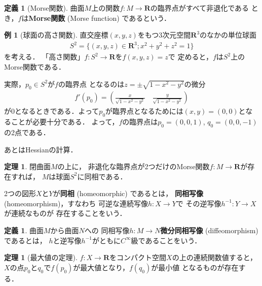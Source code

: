\documentclass[11pt, a4paper, dvipdfmx]{jsarticle}
\theoremstyle{definition}
\newcommand{\rr}{\mathbf{R}}
\newcommand{\dip}{\displaystyle} %
\theoremstyle{mystyle}
\newtheorem{DFN}[Axiom]{定義}
\newtheorem{THM}[Axiom]{定理}
\newtheorem{EG}[Axiom]{例}
\numberwithin{equation}{section} %
\begin{document}
\begin{DFN}[Morse関数]
    曲面$M$上の関数$f\colon M\to \rr$の臨界点がすべて非退化である
    とき，$f$は\textbf{Morse関数} (Morse function) であるという．
\end{DFN}

\begin{EG}[球面の高さ関数]
    直交座標$(x,y,z)$をもつ3次元空間$\rr^3$のなかの単位球面
    \begin{align}
        S^2=\{(x,y,z)\in\rr^3; x^2+y^2+z^2=1\}
    \end{align}
    を考える．
    「高さ関数」$f\colon S^2\to\rr$を$f(x,y,z)=z$で
    定めると，$f$は$S^2$上のMorse関数である．

    実際，$p_0\in S^2$が$f$の臨界点
    となるのは$z=\pm \sqrt{1-x^2-y^2}$の微分
    \begin{align*}
        f'(p_0)=\left(\frac{x}{\sqrt{1-x^2-y^2}}\quad \frac{y}{\sqrt{1-x^2-y^2}}\right)
    \end{align*}
    が0となるときである．よって$p_0$が臨界点となるためには$(x,y)=(0,0)$となることが必要十分である．
    よって，$f$の臨界点は$p_0=(0,0,1)$, $q_0=(0,0,-1)$の2点である．
    
    あとはHessianの計算．
\end{EG}

\begin{THM}
    閉曲面$M$の上に，
    非退化な臨界点が2つだけのMorse関数$f\colon M\to \rr$が存在すれば，
    $M$は球面$S^2$に同相である．
\end{THM}

2つの図形$X$と$Y$が\textbf{同相} (homeomorphic) であるとは，
\textbf{同相写像} (homeomorphism)，すなわち
可逆な連続写像$h\colon X\to Y$で
その逆写像$h^{-1}\colon Y\to X$が連続なものが
存在することをいう．

\begin{DFN}
    曲面$M$から曲面$N$への
    同相写像$h\colon M\to N$\textbf{微分同相写像} (diffeomorphism) であるとは，
    $h$と逆写像$h^{-1}$がともに$C^{\infty}$級であることをいう．
\end{DFN}

\begin{THM}[最大値の定理]
    $f\colon X\to \rr$をコンパクト空間$X$の上の連続関数値すると，
    $X$の点$p_0$と$q_0$で$f(p_0)$が最大値となり，$f(q_0)$が最小値
    となるものが存在する．
\end{THM}
\end{document}
